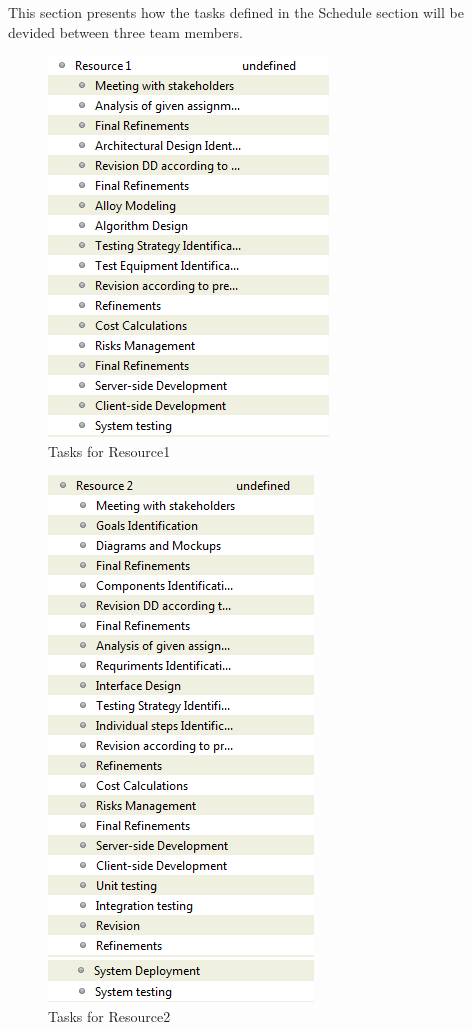 This section presents how the tasks defined in the Schedule section will be devided between three team members.
	\begin{figure}[h]
		\includegraphics[scale=0.55]{img/Resource1.png}
		\caption{Tasks for Resource1}
	\end{figure}
	\begin{figure}[h]
		\includegraphics[scale=0.55]{img/Resource2.png}
		\caption{Tasks for Resource2}
	\end{figure}
